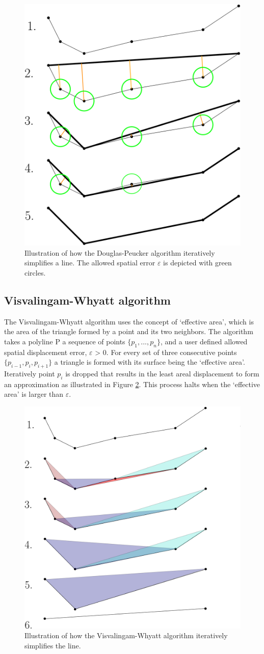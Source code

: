 \documentclass[twoside,12pt, a4paper]{report}
\begin{document}
\begin{figure}
    \centering
    \includegraphics[width=0.5\linewidth]{figures/dgpk.png}
    \caption{\cite{van2017extensive} Illustration of how the Douglas-Peucker algorithm
iteratively simplifies a line. The allowed spatial
error  $\varepsilon$  is depicted with green circles. }
    \label{fig:dgpk}
\end{figure}

\subsection{Visvalingam-Whyatt algorithm}
\cite{van2017extensive}
The Visvalingam-Whyatt algorithm \cite{doi:10.1179/000870493786962263} uses the concept
of ‘effective area’, which is the area of the triangle
formed by a point and its two neighbors. The algorithm
takes a polyline P a sequence of points $\{p_{1},..., p_{n}\}$, and
a user defined allowed spatial displacement error, $\varepsilon$ > 0.
For every set of three consecutive points $\{p_{i-1},p_{i},p_{i+1}\}$
a triangle is formed with its surface being the ‘effective area’. Iteratively point $p_{i}$ is dropped that results in
the least areal displacement to form an approximation
as illustrated in Figure \ref{fig:visv}. This process halts when the
‘effective area’ is larger than $\varepsilon$.

\begin{figure}
    \centering
    \includegraphics[width=0.5\linewidth]{figures/visv.png}
    \caption{\cite{van2017extensive} Illustration of how the Visvalingam-Whyatt
algorithm iteratively simplifies the line.}
    \label{fig:visv}
\end{figure}
\end{document}
